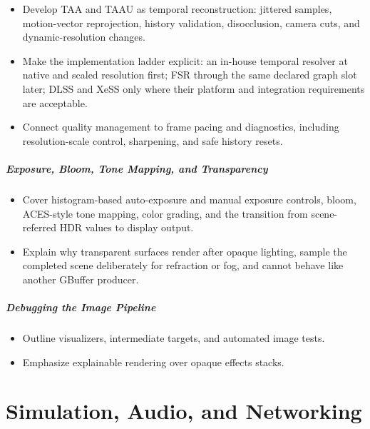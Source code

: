 \documentclass[
  11pt,
  letterpaper,
  DIV=11,
  numbers=noendperiod,
  twoside,
  open=right]{scrreprt}
\providecommand{\tightlist}{%
  \setlength{\itemsep}{0pt}\setlength{\parskip}{0pt}}
\begin{document}
\begin{itemize}
\tightlist
\item
  Develop TAA and TAAU as temporal reconstruction: jittered samples,
  motion-vector reprojection, history validation, disocclusion, camera
  cuts, and dynamic-resolution changes.
\item
  Make the implementation ladder explicit: an in-house temporal resolver
  at native and scaled resolution first; FSR through the same declared
  graph slot later; DLSS and XeSS only where their platform and
  integration requirements are acceptable.
\item
  Connect quality management to frame pacing and diagnostics, including
  resolution-scale control, sharpening, and safe history resets.
\end{itemize}

\subsubsection{Exposure, Bloom, Tone Mapping, and
Transparency}\label{exposure-bloom-tone-mapping-and-transparency}

\begin{itemize}
\tightlist
\item
  Cover histogram-based auto-exposure and manual exposure controls,
  bloom, ACES-style tone mapping, color grading, and the transition from
  scene-referred HDR values to display output.
\item
  Explain why transparent surfaces render after opaque lighting, sample
  the completed scene deliberately for refraction or fog, and cannot
  behave like another GBuffer producer.
\end{itemize}

\subsubsection{Debugging the Image
Pipeline}\label{debugging-the-image-pipeline}

\begin{itemize}
\tightlist
\item
  Outline visualizers, intermediate targets, and automated image tests.
\item
  Emphasize explainable rendering over opaque effects stacks.
\end{itemize}

\part{Simulation, Audio, and Networking}
\end{document}
